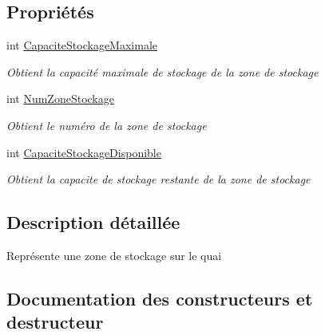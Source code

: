 \subsection*{Propriétés}
\begin{DoxyCompactItemize}
\item 
int \hyperlink{class_api_ouistreham_1_1_zone_de_stockage_a5052bc846b7ecab79ea7309d4ad9e97a}{Capacite\+Stockage\+Maximale}
\begin{DoxyCompactList}\small\item\em Obtient la capacité maximale de stockage de la zone de stockage \end{DoxyCompactList}\item 
int \hyperlink{class_api_ouistreham_1_1_zone_de_stockage_a4e6a6cefb530118d7292e078e7170c67}{Num\+Zone\+Stockage}
\begin{DoxyCompactList}\small\item\em Obtient le numéro de la zone de stockage \end{DoxyCompactList}\item 
int \hyperlink{class_api_ouistreham_1_1_zone_de_stockage_a3ae400c43899a3c76ce8987f90db2d3b}{Capacite\+Stockage\+Disponible}
\begin{DoxyCompactList}\small\item\em Obtient la capacite de stockage restante de la zone de stockage \end{DoxyCompactList}\end{DoxyCompactItemize}


\subsection{Description détaillée}
Représente une zone de stockage sur le quai 



\subsection{Documentation des constructeurs et destructeur}
\mbox{\label{class_api_ouistreham_1_1_zone_de_stockage_ac8f34a75af6e8fc70a8b4557daf25f0c}} 
